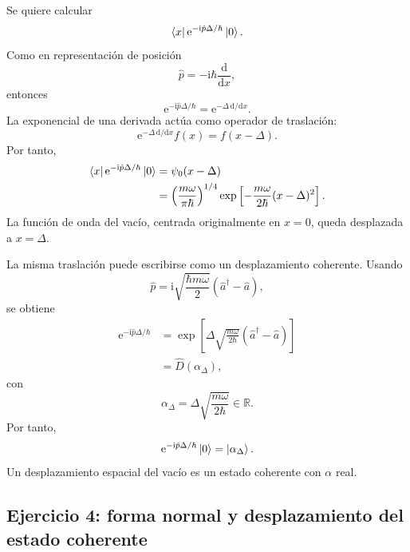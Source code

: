 \documentclass[11pt]{article}
\newcommand{\ii}{\mathrm{i}}
\newcommand{\ee}{\mathrm{e}}
\newcommand{\dd}{\mathrm{d}}
\newcommand{\adag}{\hat a^\dagger}
\begin{document}
Se quiere calcular
\begin{equation}
  \bra{x}\ee^{-\ii\hat p\Delta/\hbar}\ket0.
\end{equation}
Como en representaci\'on de posici\'on
\begin{equation}
  \hat p=-\ii\hbar\frac{\dd}{\dd x},
\end{equation}
entonces
\begin{equation}
  \ee^{-\ii\hat p\Delta/\hbar}
  =
  \ee^{-\Delta\,\dd/\dd x}.
\end{equation}
La exponencial de una derivada act\'ua como operador de traslaci\'on:
\begin{equation}
  \ee^{-\Delta\,\dd/\dd x}f(x)=f(x-\Delta).
\end{equation}
Por tanto,
\begin{align}
  \bra{x}\ee^{-\ii\hat p\Delta/\hbar}\ket0
  &=
  \psi_0(x-\Delta)\\
  &=
  \left(\frac{m\omega}{\pi\hbar}\right)^{1/4}
  \exp\left[-\frac{m\omega}{2\hbar}(x-\Delta)^2\right].
\end{align}
La funci\'on de onda del vac\'io, centrada originalmente en $x=0$, queda
desplazada a $x=\Delta$.

La misma traslaci\'on puede escribirse como un desplazamiento coherente. Usando
\begin{equation}
  \hat p=\ii\sqrt{\frac{\hbar m\omega}{2}}(\adag-\hat a),
\end{equation}
se obtiene
\begin{align}
  \ee^{-\ii\hat p\Delta/\hbar}
  &=
  \exp\left[
  \Delta\sqrt{\frac{m\omega}{2\hbar}}(\adag-\hat a)
  \right]\\
  &=
  \hat D(\alpha_\Delta),
\end{align}
con
\begin{equation}
  \alpha_\Delta=\Delta\sqrt{\frac{m\omega}{2\hbar}}\in\mathbb R.
\end{equation}
Por tanto,
\begin{equation}
  \ee^{-\ii\hat p\Delta/\hbar}\ket0
  =
  \ket{\alpha_\Delta}.
\end{equation}
Un desplazamiento espacial del vac\'io es un estado coherente con $\alpha$ real.

\subsection*{Ejercicio 4: forma normal y desplazamiento del estado coherente}
\end{document}
